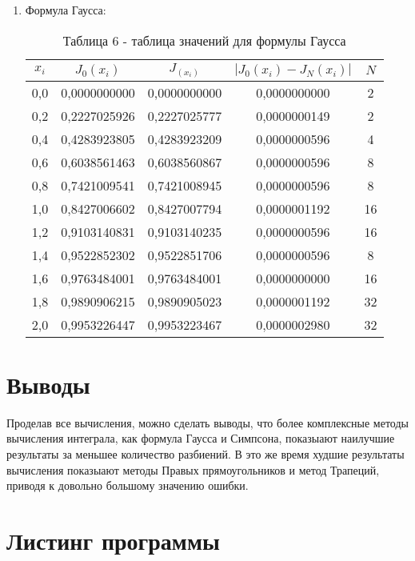 \documentclass[14pt]{article}
\begin{document}
\begin{enumerate}[label = \arabic*.]
\begin{enumerate}
{\begin{table}[h]
            \caption*{\small{Таблица 5 - таблица значений для формулы Симпсона}}
            \end{table}
            }
        \end{enumerate}
    \item {Формула Гаусса:
        \begin{table}[h]
          \centering
          \begin{tabular}{|c|c|c|c|c|}
            \hline
            $x_i$ & $J_0(x_i)$ & $J_(x_i)$ & $\left|J_0(x_i) - J_N(x_i)\right|$ & $N$\\
            \hline
            0,0 & 0,0000000000 & 0,0000000000 & 0,0000000000 & 2\\
            \hline
            0,2 & 0,2227025926 & 0,2227025777 & 0,0000000149 & 2\\
            \hline
            0,4 & 0,4283923805 & 0,4283923209 & 0,0000000596 & 4\\
            \hline
            0,6 & 0,6038561463 & 0,6038560867 & 0,0000000596 & 8\\
            \hline
            0,8 & 0,7421009541 & 0,7421008945 & 0,0000000596 & 8\\
            \hline
            1,0 & 0,8427006602 & 0,8427007794 & 0,0000001192 & 16\\
            \hline
            1,2 & 0,9103140831 & 0,9103140235 & 0,0000000596 & 16\\
            \hline
            1,4 & 0,9522852302 & 0,9522851706 & 0,0000000596 & 8\\
            \hline
            1,6 & 0,9763484001 & 0,9763484001 & 0,0000000000 & 16\\
            \hline
            1,8 & 0,9890906215 & 0,9890905023 & 0,0000001192 & 32\\
            \hline
            2,0 & 0,9953226447 & 0,9953223467 & 0,0000002980 & 32\\
            \hline
          \end{tabular}
          \caption*{\small{Таблица 6 - таблица значений для формулы Гаусса}}
        \end{table}
    }
\end{enumerate}
\section{Выводы}
\hspace{5mm}Проделав все вычисления, можно сделать выводы, что более комплексные методы вычисления интеграла, как формула Гаусса и Симпсона, показыают наилучшие результаты за меньшее количество разбиений. В это же время худшие результаты вычисления показыают методы Правых прямоугольников и метод Трапеций, приводя к довольно большому значению ошибки.
\section{Листинг программы}

\end{document}
